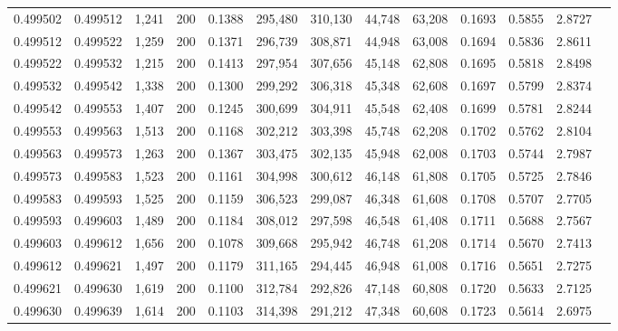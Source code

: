 \begin{tabular}{rrrrrrrrrrrrr}
0.499502 & 0.499512 & 1,241 & 200 &                                     0.1388 & 295,480 & 310,130 &  44,748 &  63,208 & 0.1693 & 0.5855 & 2.8727 \\
0.499512 & 0.499522 & 1,259 & 200 &                                     0.1371 & 296,739 & 308,871 &  44,948 &  63,008 & 0.1694 & 0.5836 & 2.8611 \\
0.499522 & 0.499532 & 1,215 & 200 &                                     0.1413 & 297,954 & 307,656 &  45,148 &  62,808 & 0.1695 & 0.5818 & 2.8498 \\
0.499532 & 0.499542 & 1,338 & 200 &                                     0.1300 & 299,292 & 306,318 &  45,348 &  62,608 & 0.1697 & 0.5799 & 2.8374 \\
0.499542 & 0.499553 & 1,407 & 200 &                                     0.1245 & 300,699 & 304,911 &  45,548 &  62,408 & 0.1699 & 0.5781 & 2.8244 \\
0.499553 & 0.499563 & 1,513 & 200 &                                     0.1168 & 302,212 & 303,398 &  45,748 &  62,208 & 0.1702 & 0.5762 & 2.8104 \\
0.499563 & 0.499573 & 1,263 & 200 &                                     0.1367 & 303,475 & 302,135 &  45,948 &  62,008 & 0.1703 & 0.5744 & 2.7987 \\
0.499573 & 0.499583 & 1,523 & 200 &                                     0.1161 & 304,998 & 300,612 &  46,148 &  61,808 & 0.1705 & 0.5725 & 2.7846 \\
0.499583 & 0.499593 & 1,525 & 200 &                                     0.1159 & 306,523 & 299,087 &  46,348 &  61,608 & 0.1708 & 0.5707 & 2.7705 \\
0.499593 & 0.499603 & 1,489 & 200 &                                     0.1184 & 308,012 & 297,598 &  46,548 &  61,408 & 0.1711 & 0.5688 & 2.7567 \\
0.499603 & 0.499612 & 1,656 & 200 &                                     0.1078 & 309,668 & 295,942 &  46,748 &  61,208 & 0.1714 & 0.5670 & 2.7413 \\
0.499612 & 0.499621 & 1,497 & 200 &                                     0.1179 & 311,165 & 294,445 &  46,948 &  61,008 & 0.1716 & 0.5651 & 2.7275 \\
0.499621 & 0.499630 & 1,619 & 200 &                                     0.1100 & 312,784 & 292,826 &  47,148 &  60,808 & 0.1720 & 0.5633 & 2.7125 \\
0.499630 & 0.499639 & 1,614 & 200 &                                     0.1103 & 314,398 & 291,212 &  47,348 &  60,608 & 0.1723 & 0.5614 & 2.6975 \\

\end{tabular}
